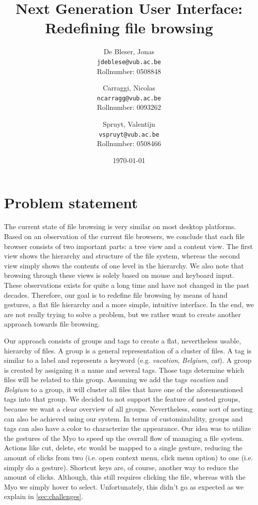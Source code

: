 \documentclass{article}
\title{Next Generation User Interface: \\Redefining file browsing}
\author{
  De Bleser, Jonas\\
  \texttt{jdeblese@vub.ac.be}\\
  Rollnumber: 0508848
  \and
  Carraggi, Nicolas\\
  \texttt{ncarragg@vub.ac.be}\\
  Rollnumber: 0093262
  \and
  Spruyt, Valentijn\\
  \texttt{vspruyt@vub.ac.be}\\
  Rollnumber: 0508466
}
\date{\today}
\begin{document}
\maketitle

\tableofcontents

\section{Problem statement}
The current state of file browsing is very similar on most desktop platforms. Based on an observation of the current file browsers, we conclude that each file browser consists of two important parts: a tree view and a content view. The first view shows the hierarchy and structure of the file system, whereas the second view simply shows the contents of one level in the hierarchy.  We also note that browsing through these views is solely based on mouse and keyboard input. These observations exists for quite a long time and have not changed in the past decades. Therefore, our goal is to redefine file browsing by means of hand gestures, a flat file hierarchy and a more simple, intuitive interface. In the end, we are not really trying to solve a problem, but we rather want to create another approach towards file browsing.

Our approach consists of groups and tags to create a flat, nevertheless usable, hierarchy of files. A group is a general representation of a cluster of files. A tag is similar to a label and represents a keyword (e.g. \textit{vacation}, \textit{Belgium}, \textit{cat}). A group is created by assigning it a name and several tags. Those tags determine which files will be related to this group. Assuming we add the tags \textit{vacation} and \textit{Belgium} to a group, it will cluster all files that have one of the aforementioned tags into that group. We decided to not support the feature of nested groups, because we want a clear overview of all groups. Nevertheless, some sort of nesting can also be achieved using our system. In terms of customizability, groups and tags can also have a color to characterize the appearance. Our idea was to utilize the gestures of the Myo to speed up the overall flow of managing a file system. Actions like cut, delete, etc would be mapped to a single gesture, reducing the amount of clicks from two (i.e. open context menu, click menu option) to one (i.e. simply do a gesture). Shortcut keys are, of course, another way to reduce the amount of clicks. Although, this still requires clicking the file, whereas with the Myo we simply hover to select. Unfortunately, this didn't go as expected as we explain in \ref{sec:challenges}.
\end{document}
